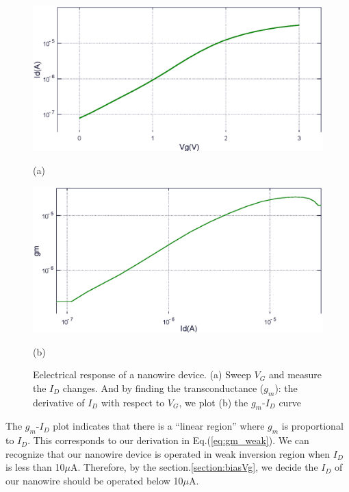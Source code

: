 \begin{figure}[!htbp]
    \centering
    \begin{minipage}[t]{1\textwidth}
        \centering
        \includegraphics[width=1\textwidth]{images/chapter3/pIdVg.eps}
        \raggedright
        (a)
    \end{minipage}
    \hfill
    \begin{minipage}[t]{1\textwidth}
        \centering
        \includegraphics[width=1\textwidth]{images/chapter3/pIdgbs.eps}
        \raggedright
        (b)
    \end{minipage}
    \caption{Eelectrical response of a nanowire device. (a) Sweep $V_G$ and measure the $I_D$ changes. And by finding the transconductance ($g_m$): the derivative of $I_D$ with respect to $V_G$, we plot (b) the $g_m$-$I_D$ curve}
    \label{fig:pIdVg}
\end{figure}

The $g_m$-$I_D$ plot indicates that there is a ``linear region'' where $g_m$ is proportional to $I_D$.
This corresponds to our derivation in Eq.(\ref{eq:gm_weak}).
We can recognize that our nanowire device is operated in weak inversion region when $I_D$ is less than 10$\mu$A.
Therefore, by the section.\ref{section:biasVg}, we decide the $I_D$ of our nanowire should be operated below 10$\mu$A.

